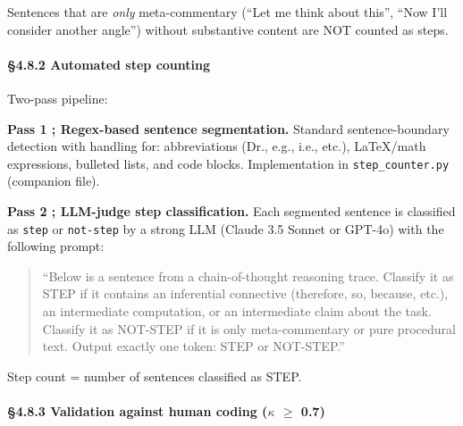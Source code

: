\documentclass{article}
\begin{document}
Sentences that are \emph{only} meta-commentary (``Let me think about
this'', ``Now I'll consider another angle'') without substantive content
are NOT counted as steps.

\paragraph{\S{}4.8.2 Automated step
counting}\label{automated-step-counting}

Two-pass pipeline:

\textbf{Pass 1 ; Regex-based sentence segmentation.} Standard
sentence-boundary detection with handling for: abbreviations (Dr., e.g.,
i.e., etc.), LaTeX/math expressions, bulleted lists, and code blocks.
Implementation in \texttt{step\_counter.py} (companion file).

\textbf{Pass 2 ; LLM-judge step classification.} Each segmented sentence
is classified as \texttt{step} or \texttt{not-step} by a strong LLM
(Claude 3.5 Sonnet or GPT-4o) with the following prompt:

\begin{quote}
``Below is a sentence from a chain-of-thought reasoning trace. Classify
it as STEP if it contains an inferential connective (therefore, so,
because, etc.), an intermediate computation, or an intermediate claim
about the task. Classify it as NOT-STEP if it is only meta-commentary or
pure procedural text. Output exactly one token: STEP or NOT-STEP.''
\end{quote}

Step count = number of sentences classified as STEP.

\paragraph{\S{}4.8.3 Validation against human coding (\ensuremath{\kappa} \ensuremath{\geq}
0.7)}\label{validation-against-human-coding-ux3ba-0.7}
\end{document}
